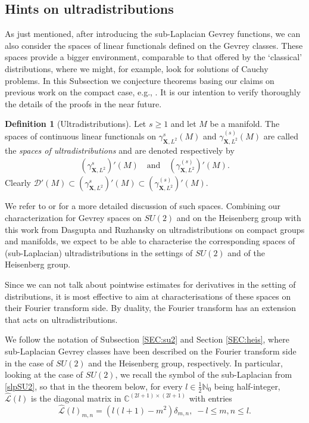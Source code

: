 \documentclass[12pt,oneside,a4paper]{book}
\numberwithin{equation}{section}     %
\theoremstyle{plain}
\theoremstyle{definition}
\newtheorem{definition}[theorem]{Definition}
\newcommand{\C}{{\mathbb C}}
\newcommand{\N}{{\mathbb N}}
\newcommand{\slp}{{\mathcal L}}
\begin{document}
\subsection{Hints on ultradistributions}

As just mentioned, after introducing the sub-Laplacian Gevrey functions, we can also consider the spaces of linear functionals defined on the Gevrey classes. These spaces provide a bigger environment, comparable to that offered by the `classical' distributions, where we might, for example, look for solutions of Cauchy problems. In this Subsection we conjecture theorems basing our claims on previous work on the compact case, e.g., \cite{DR2014}. It is our intention to verify thoroughly the details of the proofs in the near future. 

\begin{definition}[Ultradistributions]
	Let $s\geq 1$ and let $M$ be a manifold. The spaces of continuous linear functionals on $\gamma^{s}_{\mathbf{X}, L^2}(M)$ and $\gamma^{(s)}_{\mathbf{X}, L^2}(M)$ are called the {\em spaces of ultradistributions} and are denoted respectively by
	\begin{align*}
	(\gamma^{s}_{\mathbf{X}, L^2})'(M)\quad\text{and}\quad (\gamma^{(s)}_{\mathbf{X}, L^2})'(M).
	\end{align*}
	Clearly $\mathcal{D}'(M)\subset(\gamma^{s}_{\mathbf{X}, L^2})'(M)\subset(\gamma^{(s)}_{\mathbf{X}, L^2})'(M)$.
\end{definition}

We refer to \cite{DR2014} or \cite{DR2016} for a more detailed discussion of such spaces.
Combining our characterization for Gevrey spaces on $SU(2)$ and on the Heisenberg group with this work from Dasgupta and Ruzhansky on ultradistributions on compact groups and manifolds, we expect to be able to characterise the corresponding spaces of (sub-Laplacian) ultradistributions in the settings of $SU(2)$ and of the Heisenberg group. 

Since we can not talk about pointwise estimates for derivatives in the setting of distributions, it is most effective to aim at characterisations of these spaces on their Fourier transform side. By duality, the Fourier transform has an extension that acts on ultradistributions. 

We follow the notation of Subsection \ref{SEC:su2} and Section \ref{SEC:heis}, where sub-Laplacian Gevrey classes have been described on the Fourier transform side in the case of $SU(2)$ and the Heisenberg group, respectively. 
In particular, looking at the case of $SU(2)$, we recall the symbol of the sub-Laplacian from \eqref{slpSU2}, so that in the theorem below, for every $l\in \frac12\N_0$ being half-integer, $\widehat{\slp}(l)$ is the diagonal matrix in $\C^{(2l+1)\times (2l+1)}$ with entries
\begin{equation}\label{slp-d}
\widehat{\slp}(l)_{m,n}=(l(l+1)-m^2)\delta_{m,n},\; -l\leq m,n\leq l.
\end{equation}
\end{document}
